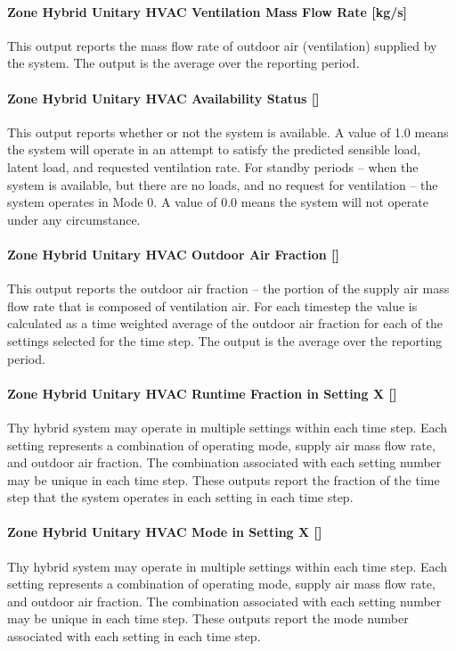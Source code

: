 \paragraph{Zone Hybrid Unitary HVAC Ventilation Mass Flow Rate [kg/s]}
This output reports the mass flow rate of outdoor air (ventilation) supplied by the system. The output is the average over the reporting period.

\paragraph{Zone Hybrid Unitary HVAC Availability Status []}
This output reports whether or not the system is available. A value of 1.0 means the system will operate in an attempt to satisfy the predicted sensible load, latent load, and requested ventilation rate. For standby periods – when the system is available, but there are no loads, and no request for ventilation – the system operates in Mode 0. A value of 0.0 means the system will not operate under any circumstance.

\paragraph{Zone Hybrid Unitary HVAC Outdoor Air Fraction []}
This output reports the outdoor air fraction – the portion of the supply air mass flow rate that is composed of ventilation air. For each timestep the value is calculated as a time weighted average of the outdoor air fraction for each of the settings selected for the time step. The output is the average over the reporting period.

\paragraph{Zone Hybrid Unitary HVAC Runtime Fraction in Setting X []}
Thy hybrid system may operate in multiple settings within each time step. Each setting represents a combination of operating mode, supply air mass flow rate, and outdoor air fraction. The combination associated with each setting number may be unique in each time step. These outputs report the fraction of the time step that the system operates in each setting in each time step.

\paragraph{Zone Hybrid Unitary HVAC Mode in Setting X []}
Thy hybrid system may operate in multiple settings within each time step. Each setting represents a combination of operating mode, supply air mass flow rate, and outdoor air fraction. The combination associated with each setting number may be unique in each time step. These outputs report the mode number associated with each setting in each time step.

